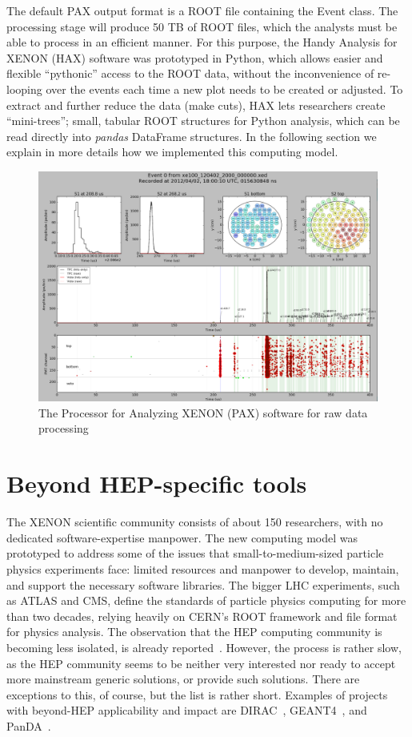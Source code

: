 \documentclass[a4paper]{jpconf}
\begin{document}
The default PAX output format is a ROOT file containing the Event class. 
The processing stage will produce 50 TB of ROOT files, which the analysts must be able to process in an efficient manner. 
For this purpose, the Handy Analysis for XENON (HAX) software was prototyped in Python, which 
allows easier and flexible ``pythonic'' access to the ROOT data, without the inconvenience of re-looping over the events each time 
a new plot needs to be created or adjusted. To extract and further reduce the data (make cuts), HAX lets researchers create ``mini-trees''; small, tabular ROOT structures for 
Python analysis, which can be read directly into \textit{pandas} DataFrame structures.
In the following section we explain in more details how we implemented this computing model.

\begin{figure}[!t]
 \centering
\begin{center}
\includegraphics[width=0.9\linewidth]{./graphics/paxer.png}
\end{center}
\caption{The Processor for Analyzing XENON (PAX) software for raw data processing}
\label{fig:paxer}
\end{figure}

\section{Beyond HEP-specific tools}
The XENON scientific community consists of about 150 researchers, with no dedicated software-expertise manpower. 
The new computing model was prototyped to address some of the issues that small-to-medium-sized particle physics 
experiments face: limited resources and manpower to develop, maintain, and support the necessary software libraries.
The bigger LHC experiments, such as ATLAS and CMS, define the standards of particle physics computing for more than two decades, relying
heavily on CERN's ROOT framework and file format for physics analysis. 
The observation that the HEP computing community is becoming less isolated, is already reported~\cite{1742-6596-513-5-052033}.
However, the process is rather slow, as the HEP community seems to be neither very interested nor ready to accept more mainstream generic solutions, or provide such solutions.
There are exceptions to this, of course, but the list is rather short. 
Examples of projects with beyond-HEP applicability and impact are DIRAC~\cite{1742-6596-119-6-062048}, GEANT4~\cite{agostinelli2003geant4}, and PanDA~\cite{Borodin:1670021}.
\end{document}
